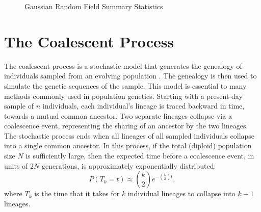 \begin{figure}
\centering
{}
\caption[Gaussian Random Field Summary Statistics]{Gaussian Random Field Summary Statistics}
\label{fig:parametric_inference:expCov_distributions}
\end{figure}

\section{The Coalescent Process}

The coalescent process is a stochastic model that generates the genealogy of individuals sampled from an evolving population \cite{Wakeley:2009}.
The genealogy is then used to simulate the genetic sequences of the sample.
This model is essential to many methods commonly used in population genetics.
Starting with a present-day sample of $n$ individuals, each individual's lineage is traced backward in time, towards a mutual common ancestor.
Two separate lineages collapse via a coalescence event, representing the sharing of an ancestor by the two lineages.
The stochastic process ends when all lineages of all sampled individuals collapse into a single common ancestor.
In this process, if the total (diploid) population size $N$ is sufficiently large, then the expected time before a coalescence event, in units of $2N$ generations, is approximately exponentially distributed:
\begin{equation}
P(T_{k}=t) \approx \binom{k}{2} e ^{-\binom{k}{2} t},
\end{equation}
where $T_k$ is the time that it takes for $k$ individual lineages to collapse into $k-1$ lineages.


